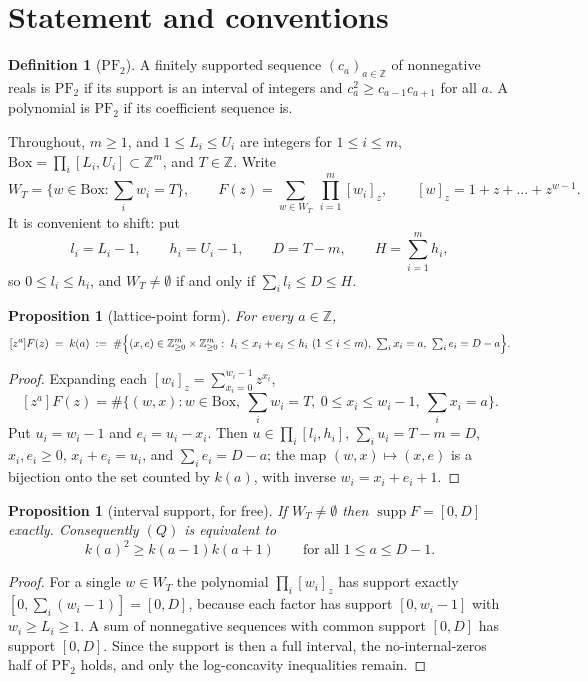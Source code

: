 \documentclass[11pt]{article}
\theoremstyle{plain}
\newtheorem{proposition}[theorem]{Proposition}
\theoremstyle{definition}
\newtheorem{definition}[theorem]{Definition}
\DeclareMathOperator{\supp}{supp}
\newcommand{\PFtwo}{\mathrm{PF}_2}
\newcommand{\Z}{\mathbb{Z}}
\newcommand{\Bx}{\mathrm{Box}}
\begin{document}
\section{Statement and conventions}

\begin{definition}[$\PFtwo$]
A finitely supported sequence $(c_a)_{a\in\Z}$ of nonnegative reals is $\PFtwo$ if its
support is an interval of integers and $c_a^2\ge c_{a-1}c_{a+1}$ for all $a$. A polynomial
is $\PFtwo$ if its coefficient sequence is.
\end{definition}

Throughout, $m\ge1$, and $1\le L_i\le U_i$ are integers for $1\le i\le m$,
$\Bx=\prod_i[L_i,U_i]\subset\Z^m$, and $T\in\Z$. Write
\[
  W_T=\{w\in\Bx:\textstyle\sum_iw_i=T\},\qquad
  F(z)=\sum_{w\in W_T}\ \prod_{i=1}^m[w_i]_z,\qquad [w]_z=1+z+\dots+z^{w-1}.
\]
It is convenient to shift: put
\[
  l_i=L_i-1,\qquad h_i=U_i-1,\qquad D=T-m,\qquad H=\sum_{i=1}^mh_i,
\]
so $0\le l_i\le h_i$, and $W_T\ne\emptyset$ if and only if $\sum_il_i\le D\le H$.

\begin{proposition}[lattice-point form]\label{prop:reform}
For every $a\in\Z$,
\[
  [z^a]F(z)\;=\;k(a)\;:=\;\#\Bigl\{(x,e)\in\Z_{\ge0}^m\times\Z_{\ge0}^m:\
  l_i\le x_i+e_i\le h_i\ (1\le i\le m),\ \textstyle\sum_ix_i=a,\ \sum_ie_i=D-a\Bigr\}.
\]
\end{proposition}

\begin{proof}
Expanding each $[w_i]_z=\sum_{x_i=0}^{w_i-1}z^{x_i}$,
\[
  [z^a]F(z)=\#\bigl\{(w,x):w\in\Bx,\ \textstyle\sum_iw_i=T,\ 0\le x_i\le w_i-1,\ \sum_ix_i=a\bigr\}.
\]
Put $u_i=w_i-1$ and $e_i=u_i-x_i$. Then $u\in\prod_i[l_i,h_i]$, $\sum_iu_i=T-m=D$,
$x_i,e_i\ge0$, $x_i+e_i=u_i$, and $\sum_ie_i=D-a$; the map $(w,x)\mapsto(x,e)$ is a
bijection onto the set counted by $k(a)$, with inverse $w_i=x_i+e_i+1$.
\end{proof}

\begin{proposition}[interval support, for free]\label{prop:supp}
If $W_T\ne\emptyset$ then $\supp F=[0,D]$ exactly. Consequently $(Q)$ is equivalent to
\[
  k(a)^2\ge k(a-1)k(a+1)\qquad\text{for all }1\le a\le D-1. \tag{$Q'$}
\]
\end{proposition}

\begin{proof}
For a single $w\in W_T$ the polynomial $\prod_i[w_i]_z$ has support exactly
$[0,\sum_i(w_i-1)]=[0,D]$, because each factor has support $[0,w_i-1]$ with $w_i\ge L_i\ge1$.
A sum of nonnegative sequences with common support $[0,D]$ has support $[0,D]$. Since the
support is then a full interval, the no-internal-zeros half of $\PFtwo$ holds, and only the
log-concavity inequalities remain.
\end{proof}
\end{document}
